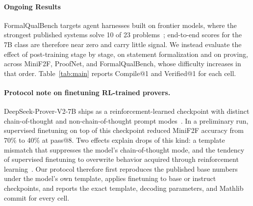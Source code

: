 \documentclass[sigconf,anonymous]{aamas}
\begin{document}
\paragraph{Ongoing Results}
FormalQualBench targets agent harnesses built on frontier models, where the
strongest published systems solve 10 of 23 problems~\citep{merlean2026};
end-to-end scores for the 7B class are therefore near zero and carry little
signal. We instead evaluate the effect of post-training stage by stage, on
statement formalization and on proving, across MiniF2F, ProofNet, and
FormalQualBench, whose difficulty increases in that order.
Table~\ref{tab:main} reports Compile@1 and Verified@1 for each cell.

\paragraph{Protocol note on finetuning RL-trained provers.}
DeepSeek-Prover-V2-7B ships as a reinforcement-learned checkpoint with distinct
chain-of-thought and non-chain-of-thought prompt modes~\citep{deepseekproverv2}.
In a preliminary run, supervised finetuning on top of this checkpoint reduced
MiniF2F accuracy from 70\% to 40\% at pass@8. Two effects explain drops of this
kind: a template mismatch that suppresses the model's chain-of-thought mode, and
the tendency of supervised finetuning to overwrite behavior acquired through
reinforcement learning~\citep{chu2025sft}. Our protocol therefore first
reproduces the published base numbers under the model's own template, applies
finetuning to base or instruct checkpoints, and reports the exact template,
decoding parameters, and Mathlib commit for every cell.
\end{document}
